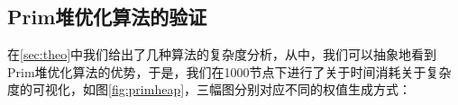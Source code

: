 \documentclass[UTF8]{ctexart}
\begin{document}
\subsection{Prim堆优化算法的验证}
在\ref{sec:theo}中我们给出了几种算法的复杂度分析，从中，我们可以抽象地看到Prim堆优化算法的优势，于是，我们在1000节点下进行了关于时间消耗关于复杂度的可视化，如图\ref{fig:primheap}，三幅图分别对应不同的权值生成方式：
\begin{figure}[htbp]
    \centering
    

\end{figure}
\end{document}

